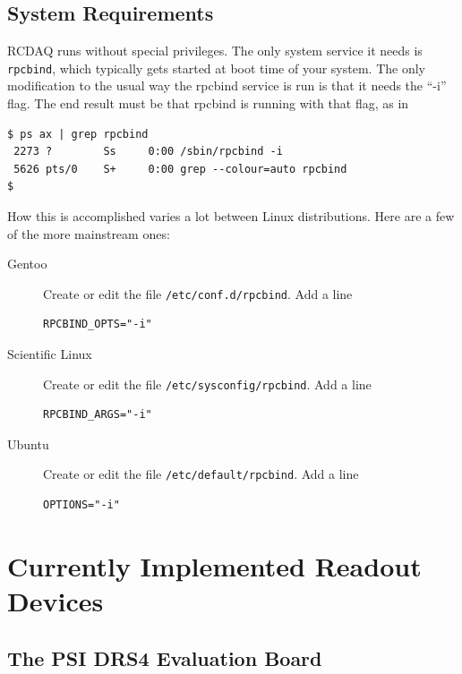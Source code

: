 \documentclass{article}[11pt]
\begin{document}
\subsection{System Requirements}

RCDAQ runs without special privileges. The only system service it
needs is \verb|rpcbind|, which typically gets started at boot time of
your system. The only modification to the usual way the rpcbind
service is run is that it needs the ``-i'' flag. The end result must be that rpcbind is running 
with that flag, as in

\begin{verbatim} 
$ ps ax | grep rpcbind
 2273 ?        Ss     0:00 /sbin/rpcbind -i
 5626 pts/0    S+     0:00 grep --colour=auto rpcbind
$
\end{verbatim}

How this is accomplished varies a lot between Linux distributions. Here are a few of the 
more mainstream ones:

\begin{description}

\item[Gentoo]  Create or edit the file \verb|/etc/conf.d/rpcbind|. Add a line

\begin{verbatim} 
RPCBIND_OPTS="-i"  
\end{verbatim}

\item[Scientific Linux]  Create or edit the file \verb|/etc/sysconfig/rpcbind|. Add a line

\begin{verbatim} 
RPCBIND_ARGS="-i"  
\end{verbatim}

\item[Ubuntu]  Create or edit the file \verb|/etc/default/rpcbind|. Add a line

\begin{verbatim} 
OPTIONS="-i"  
\end{verbatim}

\end{description}

\section{Currently Implemented Readout Devices}

\subsection{The PSI DRS4 Evaluation Board}
\label{instructions}
\end{document}
